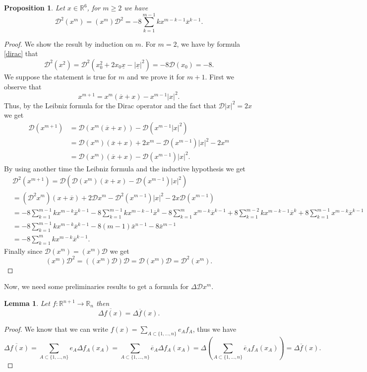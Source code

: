 \documentclass[reqno,11pt]{amsart}
\numberwithin{equation}{section}
\newtheorem{lemma}[theorem]{Lemma}
\newtheorem{proposition}[theorem]{Proposition}
\theoremstyle{definition}
\begin{document}
\begin{proposition}
\label{double_dirac}
Let $x\in\mathbb R^6$, for $m\geq 2$ we have
$$ \mathcal{D}^2(x^m)=(x^m) \mathcal{D}^2=-8\sum_{k=1}^{m-1}k x^{m-k-1}\overline{x}^{k-1}.$$
\end{proposition}
\begin{proof}
We show the result by induction on $m$. For $m=2$, we have by formula \eqref{dirac} that
$$ \mathcal{D}^2(x^2)=\mathcal{D}^2(x_0^2+2x_0\underline x-|\underline x|^2)=-8\mathcal{D}(x_0)=-8.$$
We suppose the statement is true for $m$ and we prove it for $m+1$. First we observe that
$$ x^{m+1}=x^m(\overline x+x)-x^{m-1}|x|^2 .$$
Thus, by the Leibniz formula for the Dirac operator and the fact that $ \mathcal{D} |x|^2=2x$ we get
\[
\begin{split}
\mathcal{D}(x^{m+1})& =\mathcal{D}(x^m(\overline x+x))-\mathcal{D}(x^{m-1}|x|^2)\\
&= \mathcal{D}(x^m)(\overline x+x) +2x^m-\mathcal{D}(x^{m-1})|x|^2-2x^m\\
&= \mathcal{D}(x^m)(\overline x+x)-\mathcal{D}(x^{m-1})|x|^2.
\end{split}
\]
By using another time the Leibniz formula and the inductive hypothesis we get
\[
\begin{split}
&\mathcal{D}^2(x^{m+1})=\mathcal{D}\left (\mathcal{D}(x^m)(\overline x+x)-\mathcal{D}(x^{m-1})|x|^2\right)\\
&=(\mathcal{D}^2x^m)(x+\overline x)+2\mathcal{D}x^m-\mathcal{D}^2(x^{m-1})|x|^2-2x\mathcal{D}(x^{m-1})\\
&=-8\sum_{k=1}^{m-1}k x^{m-k}\overline x^{k-1}-8\sum_{k=1}^{m-1}k x^{m-k-1}\overline x^{k}-8\sum_{k=1}^{m} x^{m-k}\overline x^{k-1}+8\sum_{k=1}^{m-2}k x^{m-k-1}\overline x^{k}+8\sum_{k=1}^{m-1}x^{m-k}\overline x^{k-1}\\
&=-8\sum_{k=1}^{m-1}k x^{m-k}\overline x^{k-1}-8(m-1) \bar{x}^{n-1}-8 \bar{x}^{m-1}\\
&=-8\sum_{k=1}^{m}k x^{m-k}\overline x^{k-1}.
\end{split}
\]
Finally since $ \mathcal{D} (x^m)= (x^m) \mathcal{D}$ we get
$$ (x^m) \mathcal{D}^2=\left( (x^m) \mathcal{D}\right) \mathcal{D}= \mathcal{D} (x^m) \mathcal{D}=\mathcal{D}^2 (x^m).$$
\end{proof}

Now, we need some preliminaries results to get a formula for $ \Delta \mathcal{D} x^m$.
\begin{lemma}
\label{conju}
Let $f: \mathbb{R}^{n+1} \to \mathbb{R}_n$ then
$$ \overline{\Delta f(x)}= \Delta \overline{f}(x).$$
\end{lemma}
\begin{proof}
We know that we can write $f(x)= \sum_{A \subset \{1,...,n\}} e_A f_A$, thus we have
$$ \overline{\Delta f(x)}= \sum_{A \subset \{1,...,n\}} e_A \Delta f_A(x_A)= \sum_{A \subset \{1,...,n\}} \overline{e}_A \Delta f_A(x_A)= \Delta \left(\sum_{A \subset \{1,...,n\}} \overline{e}_A f_A(x_A)\right)=\Delta \overline{f}(x).$$
\end{proof}
\end{document}
